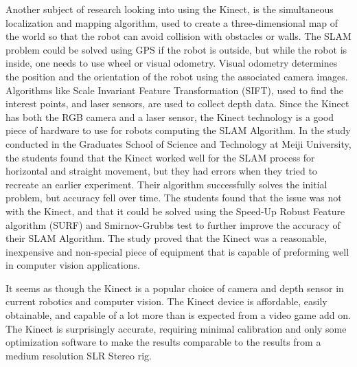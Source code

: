 \documentclass[pdftex,10.5pt]{report}
\begin{document}
Another subject of research looking into using the Kinect, is the simultaneous localization and mapping algorithm, used to create a three-dimensional map of the world so that the robot can avoid collision with obstacles or walls. The SLAM problem could be solved using GPS if the robot is outside, but while the robot is inside, one needs to use wheel or visual odometry. Visual odometry determines the position and the orientation of the robot using the associated camera images. Algorithms like Scale Invariant Feature Transformation (SIFT), used to find the interest points, and laser sensors, are used to collect depth data. Since the Kinect has both the RGB camera and a laser sensor, the Kinect technology is a good piece of hardware to use for robots computing the SLAM Algorithm. In the study conducted in the Graduates School of Science and Technology at Meiji University, the students found that the Kinect worked well for the SLAM process for horizontal and straight movement, but they had errors when they tried to recreate an earlier experiment. Their algorithm successfully solves the initial problem, but accuracy fell over time.\cite{cite2} The students found that the issue was not with the Kinect, and that it could be solved using the Speed-Up Robust Feature algorithm (SURF) and Smirnov-Grubbs test to further improve the accuracy of their SLAM Algorithm. The study proved that the Kinect was a reasonable, inexpensive and non-special piece of equipment that is capable of preforming well in computer vision applications.

It seems as though the Kinect is a popular choice of camera and depth sensor in current robotics and computer vision. The Kinect device is affordable, easily obtainable, and capable of a lot more than is expected from a video game add on. The Kinect is surprisingly accurate, requiring minimal calibration and only some optimization software to make the results comparable to the results from a medium resolution SLR Stereo rig.
\end{document}
